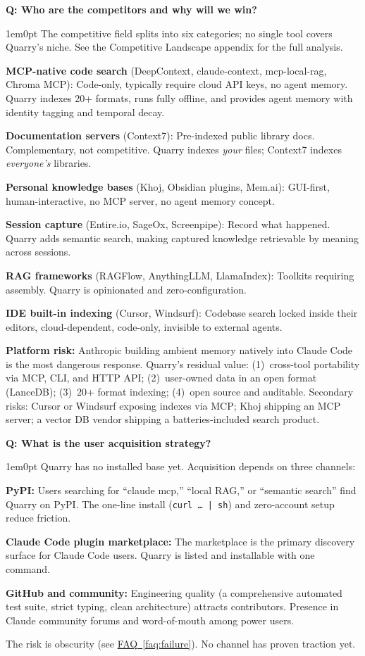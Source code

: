 \documentclass[11pt,letterpaper]{article}
\newcounter{faqnum}
\newenvironment{faqpair}[1]{%
  \needspace{4\baselineskip}%
  \vspace{0.5em}%
  \refstepcounter{faqnum}%
  \noindent\textbf{\color{SectionBlue}Q\thefaqnum: #1}\par\nopagebreak[4]%
  \vspace{0.2em}%
  \begin{adjustwidth}{1em}{0pt}%
  \setlength{\parindent}{0pt}%
}{%
  \end{adjustwidth}%
  \vspace{0.5em}%
}
\newcommand{\faqref}[1]{\hyperref[#1]{FAQ~\ref*{#1}}}
\begin{document}
\begin{faqpair}{Who are the competitors and why will we win?}\label{faq:competitors}
  The competitive field splits into six categories; no single tool covers
  Quarry's niche. See the Competitive Landscape appendix for the full analysis.

  \textbf{MCP-native code search} (DeepContext, claude-context, mcp-local-rag,
  Chroma MCP): Code-only, typically require cloud API keys, no agent memory.
  Quarry indexes 20+ formats, runs fully offline, and provides agent memory with
  identity tagging and temporal decay.

  \textbf{Documentation servers} (Context7): Pre-indexed public library docs.
  Complementary, not competitive. Quarry indexes \emph{your} files; Context7
  indexes \emph{everyone's} libraries.

  \textbf{Personal knowledge bases} (Khoj, Obsidian plugins, Mem.ai):
  GUI-first, human-interactive, no MCP server, no agent memory concept.

  \textbf{Session capture} (Entire.io, SageOx, Screenpipe): Record what
  happened. Quarry adds semantic search, making captured knowledge retrievable
  by meaning across sessions.

  \textbf{RAG frameworks} (RAGFlow, AnythingLLM, LlamaIndex): Toolkits
  requiring assembly. Quarry is opinionated and zero-configuration.

  \textbf{IDE built-in indexing} (Cursor, Windsurf): Codebase search locked
  inside their editors, cloud-dependent, code-only, invisible to external agents.

  \textbf{Platform risk:} Anthropic building ambient memory natively into
  Claude Code is the most dangerous response. Quarry's residual value:
  (1)~cross-tool portability via MCP, CLI, and HTTP API; (2)~user-owned data in
  an open format (LanceDB); (3)~20+ format indexing; (4)~open source and
  auditable. Secondary risks: Cursor or Windsurf exposing indexes via MCP; Khoj
  shipping an MCP server; a vector DB vendor shipping a batteries-included
  search product.
\end{faqpair}

\begin{faqpair}{What is the user acquisition strategy?}\label{faq:acquisition}
  Quarry has no installed base yet. Acquisition depends on three channels:

  \textbf{PyPI:} Users searching for ``claude mcp,'' ``local RAG,'' or
  ``semantic search'' find Quarry on PyPI. The one-line install
  (\texttt{curl~\ldots~|~sh}) and zero-account setup reduce friction.

  \textbf{Claude Code plugin marketplace:} The marketplace is the primary
  discovery surface for Claude Code users. Quarry is listed and installable
  with one command.

  \textbf{GitHub and community:} Engineering quality (a comprehensive
  automated test suite, strict typing, clean architecture) attracts
  contributors. Presence in Claude community forums and word-of-mouth among
  power users.

  The risk is obscurity (see \faqref{faq:failure}). No channel has proven
  traction yet.
\end{faqpair}
\end{document}
